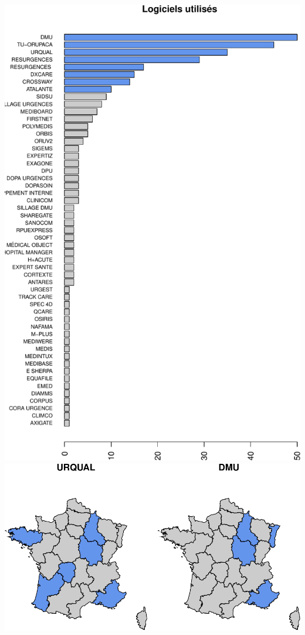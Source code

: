 \documentclass[]{article}
\begin{document}
\includegraphics{septembre2015_files/figure-latex/unnamed-chunk-6-1.pdf}
\includegraphics{septembre2015_files/figure-latex/unnamed-chunk-6-2.pdf}
\end{document}
